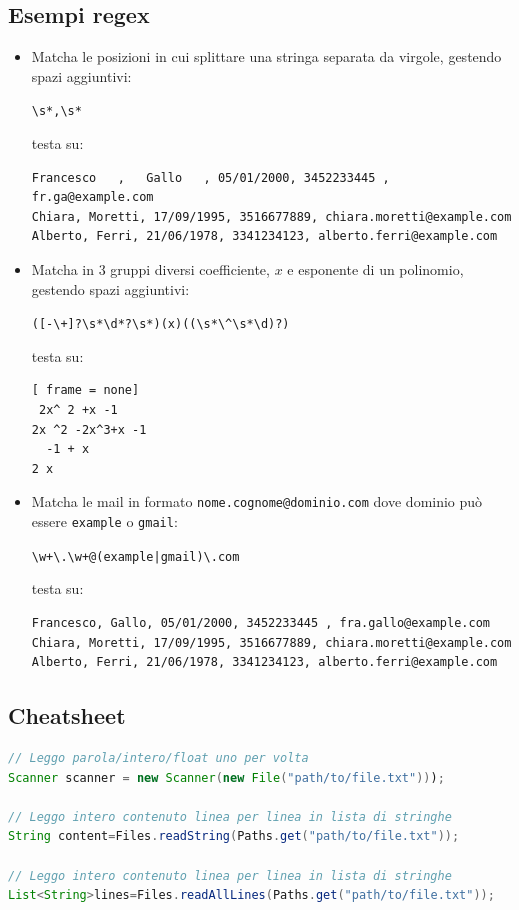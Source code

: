 \subsection{Esempi regex}
\begin{itemize}
	\item Matcha le posizioni in cui splittare una stringa separata da virgole, gestendo spazi aggiuntivi:
	      \begin{center}
		      \verb|\s*,\s*|
	      \end{center}

	      testa su:

	      \begin{lstlisting}[frame = none]
Francesco   ,   Gallo   , 05/01/2000, 3452233445 , fr.ga@example.com
Chiara, Moretti, 17/09/1995, 3516677889, chiara.moretti@example.com
Alberto, Ferri, 21/06/1978, 3341234123, alberto.ferri@example.com 
          \end{lstlisting}
	\item Matcha in 3 gruppi diversi coefficiente, $ x $ e esponente di un polinomio, gestendo spazi aggiuntivi:
	      \begin{center}
		      \verb|([-\+]?\s*\d*?\s*)(x)((\s*\^\s*\d)?)|
	      \end{center}
	      testa su:
	      \begin{lstlisting}[ frame = none]
 2x^ 2 +x -1
2x ^2 -2x^3+x -1
  -1 + x
2 x
          \end{lstlisting}
	\item Matcha le mail in formato \verb|nome.cognome@dominio.com| dove dominio può essere \verb|example| o \verb|gmail|:
	      \begin{center}
		      \verb|\w+\.\w+@(example|\texttt{|}\verb|gmail)\.com|
	      \end{center}
	      testa su:

	      \begin{lstlisting}[frame = none]
Francesco, Gallo, 05/01/2000, 3452233445 , fra.gallo@example.com
Chiara, Moretti, 17/09/1995, 3516677889, chiara.moretti@example.com
Alberto, Ferri, 21/06/1978, 3341234123, alberto.ferri@example.com 
          \end{lstlisting}
\end{itemize}

\newpage
\subsection{Cheatsheet}
\footnotesize
{}
\begin{lstlisting}[language = java, frame = none, basicstyle=\ttfamily\footnotesize]
// Leggo parola/intero/float uno per volta
Scanner scanner = new Scanner(new File("path/to/file.txt")));

// Leggo intero contenuto linea per linea in lista di stringhe
String content=Files.readString(Paths.get("path/to/file.txt"));

// Leggo intero contenuto linea per linea in lista di stringhe
List<String>lines=Files.readAllLines(Paths.get("path/to/file.txt"));
\end{lstlisting}

